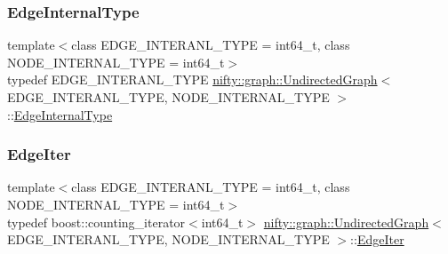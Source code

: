 \subsubsection{\texorpdfstring{Edge\+Internal\+Type}{EdgeInternalType}}
{\footnotesize\ttfamily template$<$class E\+D\+G\+E\+\_\+\+I\+N\+T\+E\+R\+A\+N\+L\+\_\+\+T\+Y\+PE = int64\+\_\+t, class N\+O\+D\+E\+\_\+\+I\+N\+T\+E\+R\+N\+A\+L\+\_\+\+T\+Y\+PE = int64\+\_\+t$>$ \\
typedef E\+D\+G\+E\+\_\+\+I\+N\+T\+E\+R\+A\+N\+L\+\_\+\+T\+Y\+PE \hyperlink{classnifty_1_1graph_1_1UndirectedGraph}{nifty\+::graph\+::\+Undirected\+Graph}$<$ E\+D\+G\+E\+\_\+\+I\+N\+T\+E\+R\+A\+N\+L\+\_\+\+T\+Y\+PE, N\+O\+D\+E\+\_\+\+I\+N\+T\+E\+R\+N\+A\+L\+\_\+\+T\+Y\+PE $>$\+::\hyperlink{classnifty_1_1graph_1_1UndirectedGraph_a70e38582c25deca5e0ce080277cb30fc}{Edge\+Internal\+Type}\hspace{0.3cm}{\ttfamily [protected]}}

\mbox{\label{classnifty_1_1graph_1_1UndirectedGraph_aa37a0dc690ad1257d5eb5105e7d66bba}} 
\subsubsection{\texorpdfstring{Edge\+Iter}{EdgeIter}}
{\footnotesize\ttfamily template$<$class E\+D\+G\+E\+\_\+\+I\+N\+T\+E\+R\+A\+N\+L\+\_\+\+T\+Y\+PE = int64\+\_\+t, class N\+O\+D\+E\+\_\+\+I\+N\+T\+E\+R\+N\+A\+L\+\_\+\+T\+Y\+PE = int64\+\_\+t$>$ \\
typedef boost\+::counting\+\_\+iterator$<$int64\+\_\+t$>$ \hyperlink{classnifty_1_1graph_1_1UndirectedGraph}{nifty\+::graph\+::\+Undirected\+Graph}$<$ E\+D\+G\+E\+\_\+\+I\+N\+T\+E\+R\+A\+N\+L\+\_\+\+T\+Y\+PE, N\+O\+D\+E\+\_\+\+I\+N\+T\+E\+R\+N\+A\+L\+\_\+\+T\+Y\+PE $>$\+::\hyperlink{classnifty_1_1graph_1_1UndirectedGraph_aa37a0dc690ad1257d5eb5105e7d66bba}{Edge\+Iter}}

\mbox{\label{classnifty_1_1graph_1_1UndirectedGraph_a77256cc943f931180bf84b14d943f39a}} 
